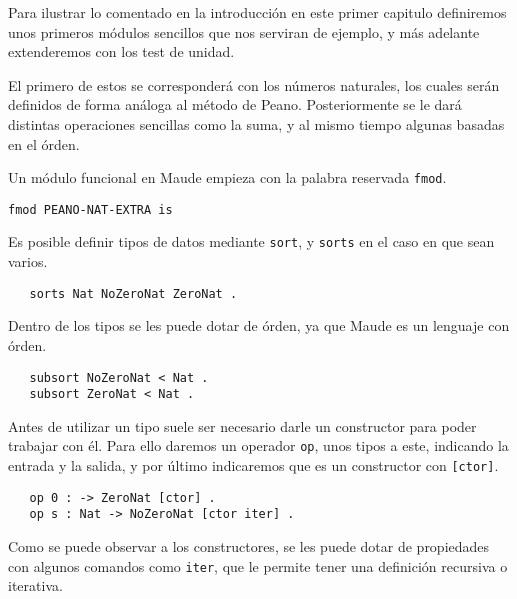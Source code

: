 
Para ilustrar lo comentado en la introducción en este primer capitulo definiremos unos primeros módulos sencillos que nos serviran de ejemplo, y más adelante extenderemos con los test de unidad. \par
El primero de estos se corresponderá con los números naturales, los cuales ser\'an definidos de forma análoga al método de Peano. Posteriormente se le dará distintas operaciones sencillas como la suma, y al mismo tiempo algunas basadas en el órden.\par

Un módulo funcional en Maude empieza con la palabra reservada \texttt{fmod}. \par

{\codesize
\begin{verbatim}
fmod PEANO-NAT-EXTRA is
\end{verbatim}
}

Es posible definir tipos de datos mediante \texttt{sort}, y \texttt{sorts} en el caso en que sean varios. \par

{\codesize
\begin{verbatim}
   sorts Nat NoZeroNat ZeroNat .
\end{verbatim}
}

Dentro de los tipos se les puede dotar de órden, ya que Maude es un lenguaje con órden. \par

{\codesize
\begin{verbatim}
   subsort NoZeroNat < Nat .
   subsort ZeroNat < Nat .
\end{verbatim}
}

Antes de utilizar un tipo suele ser necesario darle un constructor para poder trabajar con él. Para ello daremos un operador \texttt{op}, unos tipos a este, indicando la entrada y la salida, y por último indicaremos que es un constructor con \texttt{[ctor]}. \par

{\codesize
\begin{verbatim}
   op 0 : -> ZeroNat [ctor] .
   op s : Nat -> NoZeroNat [ctor iter] .
\end{verbatim}
}

Como se puede observar a los constructores, se les puede dotar de propiedades con algunos comandos como \texttt{iter}, que le permite tener una definición recursiva o iterativa. \par

